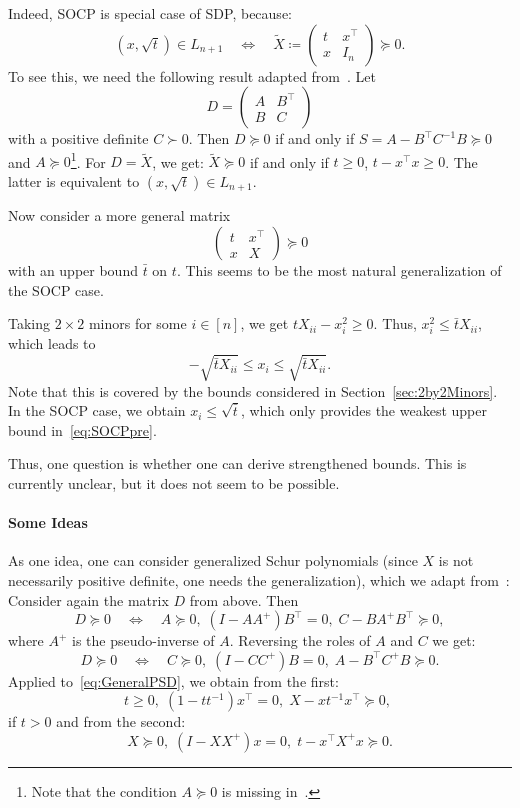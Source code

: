 \documentclass[10pt, a4paper]{article}
\newcommand{\define}{\coloneqq}
\newcommand{\T}{^{\top}}
\begin{document}
Indeed, SOCP is special case of SDP, because:
\[
  (x,\sqrt{t}) \in L_{n+1} \quad\Leftrightarrow\quad
  \tilde{X} \define
  \begin{pmatrix}
    t & x\T\\
    x & I_n
  \end{pmatrix}
  \succeq 0.
\]
To see this, we need the following result adapted
from~\cite[Section~A.5.5]{BoyV09}. Let
\[
  D = \begin{pmatrix}
    A & B\T\\
    B & C
  \end{pmatrix}
\]
with a positive definite $C \succ 0$. Then $D \succeq 0$ if and only if
$S = A - B\T C^{-1} B \succeq 0$ and $A \succeq 0$\footnote{Note that the
  condition $A \succeq 0$ is missing in~\cite{BoyV09}.}. For $D = \tilde{X}$, we
get: $\tilde{X} \succeq 0$ if and only if $t \geq 0$, $t - x\T x \geq
0$. The latter is equivalent to $(x,\sqrt{t}) \in L_{n+1}$.

Now consider a more general matrix
\begin{equation}\label{eq:GeneralPSD}
  \begin{pmatrix}
    t & x\T\\
    x & X
  \end{pmatrix}
  \succeq 0
\end{equation}
with an upper bound $\bar{t}$ on $t$. This seems to be the most natural
generalization of the SOCP case.

Taking $2 \times 2$ minors for some $i \in [n]$, we get
$t X_{ii} - x_i^2 \geq 0$. Thus, $x_i^2 \leq \bar{t} X_{ii}$, which leads
to
\[
  - \sqrt{\bar{t} X_{ii}} \leq x_i \leq \sqrt{\bar{t} X_{ii}}.
\]
Note that this is covered by the bounds considered in
Section~\ref{sec:2by2Minors}. In the SOCP case, we obtain
$x_i \leq \sqrt{\bar{t}}$, which only provides the weakest upper bound
in~\eqref{eq:SOCPpre}.

Thus, one question is whether one can derive strengthened bounds. This is
currently unclear, but it does not seem to be possible.

\paragraph*{Some Ideas}
As one idea, one can consider generalized Schur
polynomials (since $X$ is not necessarily positive definite, one needs the
generalization), which we adapt from~\cite[Section~A.5.5]{BoyV09}: Consider
again the matrix $D$ from above. Then
\[
  D \succeq 0 \quad\Leftrightarrow\quad
  A \succeq 0,\; (I - AA^{+})B\T = 0,\; C - B A^{+} B\T \succeq 0,
\]
where $A^+$ is the pseudo-inverse of $A$. Reversing the roles of $A$ and
$C$ we get:
\[
  D \succeq 0 \quad\Leftrightarrow\quad
  C \succeq 0,\; (I - CC^{+})B = 0,\; A - B\T C^{+} B \succeq 0.
\]
Applied to~\eqref{eq:GeneralPSD}, we obtain from the first:
\begin{equation}\label{eq:GenSchur1}
  t \geq 0,\; (1 - t t^{-1}) x\T = 0,\; X - x t^{-1} x\T \succeq 0,\; 
\end{equation}
if $t > 0$ and from the second:
\begin{equation}\label{eq:GenSchur2}
  X \succeq 0,\; (I - XX^{+})x = 0,\; t - x\T X^{+} x \succeq 0.
\end{equation}
\end{document}
